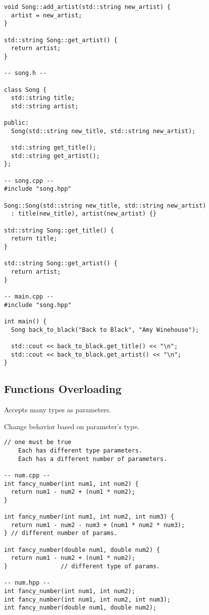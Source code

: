 \begin{verbatim}
void Song::add_artist(std::string new_artist) {
  artist = new_artist;
}

std::string Song::get_artist() {
  return artist;
}

-- song.h --

class Song {
  std::string title;
  std::string artist;

public:
  Song(std::string new_title, std::string new_artist);

  std::string get_title();
  std::string get_artist();
};

-- song.cpp --
#include "song.hpp"

Song::Song(std::string new_title, std::string new_artist)
  : title(new_title), artist(new_artist) {}

std::string Song::get_title() {
  return title;
}

std::string Song::get_artist() {
  return artist;
}

-- main.cpp --
#include "song.hpp"

int main() { 
  Song back_to_black("Back to Black", "Amy Winehouse");

  std::cout << back_to_black.get_title() << "\n";
  std::cout << back_to_black.get_artist() << "\n";
}
\end{verbatim}

\subsection{Functions Overloading}

Accepts many types as parameters.

Change behavior based on parameter's type.

\begin{verbatim}
// one must be true
    Each has different type parameters.
    Each has a different number of parameters.
    
-- num.cpp --
int fancy_number(int num1, int num2) {
  return num1 - num2 + (num1 * num2);
}

int fancy_number(int num1, int num2, int num3) {
  return num1 - num2 - num3 + (num1 * num2 * num3);
} // different number of params.

int fancy_number(double num1, double num2) {
  return num1 - num2 + (num1 * num2);
}               // different type of params.

-- num.hpp --
int fancy_number(int num1, int num2);
int fancy_number(int num1, int num2, int num3);
int fancy_number(double num1, double num2);
\end{verbatim}

